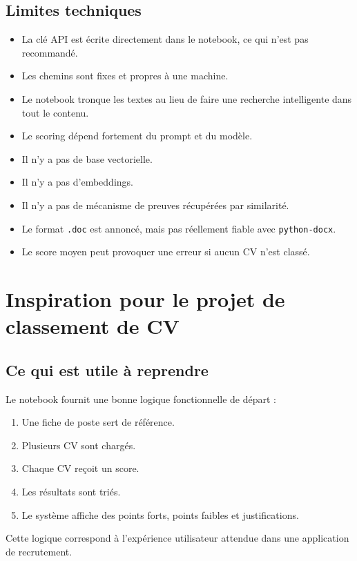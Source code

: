 \documentclass[12pt,a4paper]{article}
\begin{document}
\subsection{Limites techniques}

\begin{itemize}
  \item La clé API est écrite directement dans le notebook, ce qui n'est pas recommandé.
  \item Les chemins sont fixes et propres à une machine.
  \item Le notebook tronque les textes au lieu de faire une recherche intelligente dans tout le contenu.
  \item Le scoring dépend fortement du prompt et du modèle.
  \item Il n'y a pas de base vectorielle.
  \item Il n'y a pas d'embeddings.
  \item Il n'y a pas de mécanisme de preuves récupérées par similarité.
  \item Le format \texttt{.doc} est annoncé, mais pas réellement fiable avec \texttt{python-docx}.
  \item Le score moyen peut provoquer une erreur si aucun CV n'est classé.
\end{itemize}

\section{Inspiration pour le projet de classement de CV}

\subsection{Ce qui est utile à reprendre}

Le notebook fournit une bonne logique fonctionnelle de départ :

\begin{enumerate}
  \item Une fiche de poste sert de référence.
  \item Plusieurs CV sont chargés.
  \item Chaque CV reçoit un score.
  \item Les résultats sont triés.
  \item Le système affiche des points forts, points faibles et justifications.
\end{enumerate}

Cette logique correspond à l'expérience utilisateur attendue dans une application de recrutement.
\end{document}
